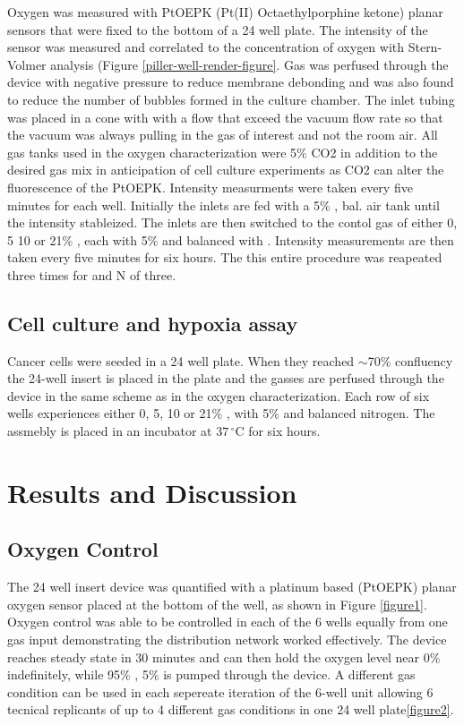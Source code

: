 Oxygen was measured with PtOEPK (Pt(II) Octaethylporphine ketone) planar sensors that were fixed to the bottom of a 24 well plate. 
The intensity of the sensor was measured and correlated to the concentration of oxygen with Stern-Volmer analysis (Figure \ref{piller-well-render-figure}.
Gas was perfused through the device with negative pressure to reduce membrane debonding and was also found to reduce the number of bubbles formed in the culture chamber.
The inlet tubing was placed in a cone with with a flow that exceed the vacuum flow rate so that the vacuum was always pulling in the gas of interest and not the room air.
All gas tanks used in the oxygen characterization were 5\% CO2 in addition to the desired gas mix in anticipation of cell culture experiments as CO2 can alter the fluorescence of the PtOEPK.
Intensity measurments were taken every five minutes for each well.
Initially the inlets are fed with a 5\% , bal. air tank until the intensity stableized.
The inlets are then switched to the contol gas of either 0, 5 10 or 21\% , each with 5\%  and balanced with .
Intensity measurements are then taken every five minutes for six hours.
The this entire procedure was reapeated three times for and N of three. 

\subsection*{Cell culture and hypoxia assay}

Cancer cells were seeded in a 24 well plate.
When they reached $\sim$70\% confluency the 24-well insert is placed in the plate and the gasses are perfused through the device in the same scheme as in the oxygen characterization.
Each row of six wells experiences either 0, 5, 10 or 21\% , with 5\%  and balanced nitrogen.
The assmebly is placed in an incubator at $37\,^{\circ}\mathrm{C}$ for six hours. 


\section*{Results and Discussion}

\subsection*{Oxygen Control}
The 24 well insert device was quantified with a platinum based (PtOEPK) planar oxygen sensor placed at the bottom of the well, as shown in Figure \ref{figure1}.
Oxygen control was able to be controlled in each of the 6 wells equally from one gas input demonstrating the distribution network worked effectively.
The device reaches steady state in 30 minutes and can then hold the oxygen level near 0\%  indefinitely, while 95\% , 5\%  is pumped through the device. 
A different gas condition can be used in each sepereate iteration of the 6-well unit allowing 6 tecnical replicants of up to 4 different gas conditions in one 24 well plate\ref{figure2}.

